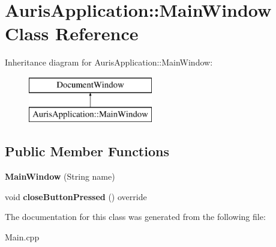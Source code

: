 \hypertarget{class_auris_application_1_1_main_window}{}\section{Auris\+Application\+:\+:Main\+Window Class Reference}
\label{class_auris_application_1_1_main_window}
Inheritance diagram for Auris\+Application\+:\+:Main\+Window\+:\begin{figure}[H]
\begin{center}
\leavevmode
\includegraphics[height=2.000000cm]{class_auris_application_1_1_main_window}
\end{center}
\end{figure}
\subsection*{Public Member Functions}
\begin{DoxyCompactItemize}
\item 
\mbox{\label{class_auris_application_1_1_main_window_acb53902aca9ea0855503ea2641532b77}} 
{\bfseries Main\+Window} (String name)
\item 
\mbox{\label{class_auris_application_1_1_main_window_afb4d7fc91cb5e1e2fe544e598d272690}} 
void {\bfseries close\+Button\+Pressed} () override
\end{DoxyCompactItemize}


The documentation for this class was generated from the following file\+:\begin{DoxyCompactItemize}
\item 
Main.\+cpp\end{DoxyCompactItemize}

